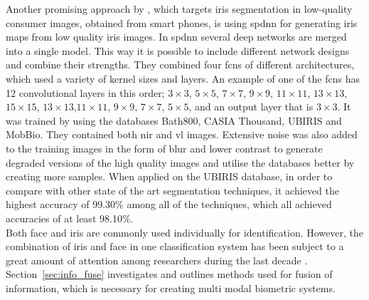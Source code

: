 Another promising approach by \cite{Bazrafkan2017}, which targets iris segmentation in low-quality consumer images, obtained from smart phones, is using \gls{spdnn} for generating iris maps from low quality iris images.  In \gls{spdnn} several deep networks are merged into a single model. This way it is possible to include different network designs and combine their strengths. They combined four \gls{fcn}s of different architectures, which used a variety of kernel sizes and layers. An example of one of the \gls{fcn}s has 12 convolutional layers in this order; $3\times3$, $5\times5$, $7\times7$, $9\times9$, $11\times11$, $13\times13$, $15\times15$, $13\times13$,$11\times11$, $9\times9$, $7\times7$, $5\times5$, and an output layer that is $3\times3$. It was trained by using the databases Bath800, CASIA Thousand, UBIRIS and MobBio. They contained both \gls{nir} and \gls{vl} images. Extensive noise was also added to the training images in the form of blur and lower contrast to generate degraded versions of the high quality images and utilise the databases better by creating more samples. When applied on the UBIRIS database, in order to compare with other state of the art segmentation techniques, it achieved the highest accuracy of 99.30\% among all of the techniques, which all achieved accuracies of at least 98.10\%.\\

Both face and iris are commonly used individually for identification. However, the combination of iris and face in one classification system has been subject to a great amount of attention among researchers during the last decade \citep{Al-Waisy2017a}. Section~\ref{sec:info_fuse} investigates and outlines methods used for fusion of  information, which is necessary for creating multi modal biometric systems.  












